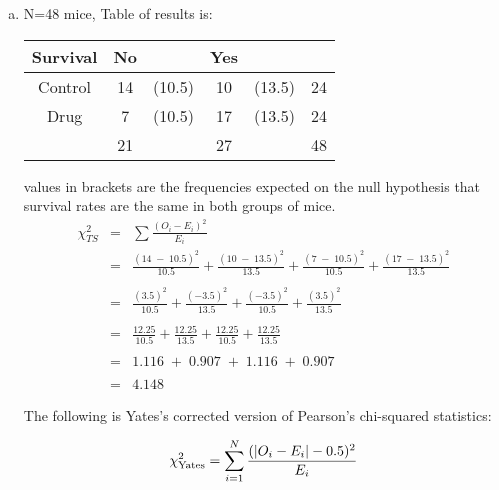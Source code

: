 \documentclass[a4paper,12pt]{article}
\begin{document}
\begin{enumerate}[(a)]
\item N=48 mice, Table of results is:



\begin{center}
\begin{tabular}{|c|cc|cc|c|} \hline
Survival & No & & Yes & & \\ \hline
Control & 14 & (10.5) & 10 & (13.5) & 24 \\ \hline
Drug & 7& (10.5) & 17& (13.5)&  24 \\ \hline
& 21 & & 27 & & 48\\ \hline
\end{tabular}
\end{center}

values in brackets are the frequencies expected on the null hypothesis that survival rates
are the same in both groups of mice.
\begin{eqnarray*}
\chi^2_{TS} &=&
\sum  \frac{(O_{i} - E_{i})^2}{E_{i}}
\\ 
&=& \frac{(14 \;-\;10.5)^2}{10.5} + \frac{(10 \;-\;13.5)^2}{13.5} + \frac{(7 \;-\;10.5)^2}{10.5} + \frac{(17 \;-\;13.5)^2}{13.5} \\
& & \\
&=&\frac{(3.5)^2}{10.5} + \frac{(-3.5)^2}{13.5} + \frac{(-3.5)^2}{10.5} + \frac{(3.5)^2}{13.5} \\
& & \\
&=&\frac{12.25}{10.5} + \frac{12.25}{13.5} + \frac{12.25}{10.5} + \frac{12.25}{13.5} \\
& & \\
&=& 1.116 \;+\; 0.907 \;+\; 1.116 \;+\;  0.907 \\ & & \\ &=&  4.148
\end{eqnarray*}



The following is Yates's corrected version of Pearson's chi-squared statistics:

\[{\displaystyle \chi _{\text{Yates}}^{2}=\sum _{i=1}^{N}{(|O_{i}-E_{i}|-0.5)^{2} \over E_{i}}}
\]


\end{enumerate}
\end{document}

